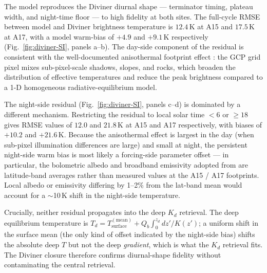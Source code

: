 \documentclass[11pt]{report}
\begin{document}
The model reproduces the Diviner diurnal shape --- terminator
timing, plateau width, and night-time floor --- to high fidelity at
both sites. The full-cycle RMSE between model and Diviner brightness
temperature is $12.4$\,K at A15 and $17.5$\,K at A17, with a model
warm-bias of $+4.9$ and $+9.1$\,K respectively
(Fig.~\ref{fig:diviner-SI}, panels a--b). The day-side component of
the residual is consistent with the well-documented anisothermal
footprint effect \citep{bandfield2015,hayne2017}: the GCP grid pixel
mixes sub-pixel-scale shadows, slopes, and rocks, which broaden the
distribution of effective temperatures and reduce the peak
brightness compared to a 1-D homogeneous radiative-equilibrium
model.

The night-side residual (Fig.~\ref{fig:diviner-SI}, panels c--d)
is dominated by a different mechanism. Restricting the residual to
local solar time $<\!6$ or $\geq\!18$ gives RMSE values of $12.0$
and $21.8$\,K at A15 and A17 respectively, with biases of $+10.2$
and $+21.6$\,K. Because the anisothermal effect is largest in the
day (when sub-pixel illumination differences are large) and small
at night, the persistent night-side warm bias is most likely a
forcing-side parameter offset --- in particular, the bolometric
albedo and broadband emissivity adopted from
\citet{vasavada2012,bandfield2015} are latitude-band averages
rather than measured values at the A15 / A17 footprints. Local
albedo or emissivity differing by 1--2\% from the lat-band mean
would account for a $\sim$10\,K shift in the night-side temperature.

Crucially, neither residual propagates into the deep $K_d$
retrieval. The deep equilibrium temperature is $T_d = T_\mathrm{surface}^{(\mathrm{mean})} + Q_b\!\int_0^{z_d}\!dz'/K(z')$;
a uniform shift in the surface mean (the only kind of offset
indicated by the night-side bias) shifts the absolute deep $T$ but
not the deep \emph{gradient}, which is what the $K_d$ retrieval
fits. The Diviner closure therefore confirms diurnal-shape fidelity
without contaminating the central retrieval.
\end{document}
